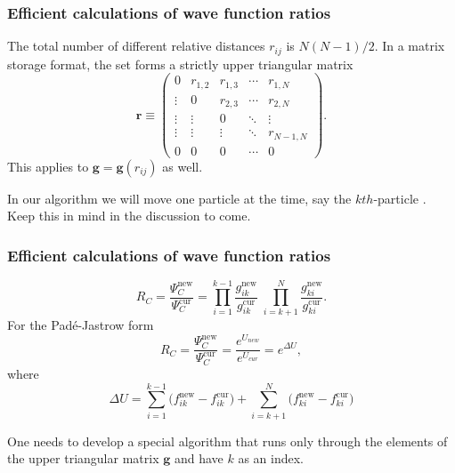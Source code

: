 \documentclass[compress]{beamer}
\newcommand{\bfv}[1]{\boldsymbol{#1}}                     %
\begin{document}
\frame
 {
   \frametitle{Efficient calculations of wave function ratios}
 \begin{small}
 {\scriptsize

The total number of different relative distances $r_{ij}$ is $N(N-1)/2$. In a matrix storage format, the set forms a strictly upper triangular matrix
\begin{equation}\label{utrij}
 \bfv{r} \equiv \begin{pmatrix}
  0 & r_{1,2} & r_{1,3} & \cdots & r_{1,N} \\
  \vdots & 0       & r_{2,3} & \cdots & r_{2,N} \\
  \vdots & \vdots  & 0  & \ddots & \vdots  \\
  \vdots & \vdots  & \vdots  & \ddots  & r_{N-1,N} \\
  0 & 0  & 0  & \cdots  & 0
 \end{pmatrix}.
\end{equation}
This applies to  $\bfv{g} = \bfv{g}(r_{ij})$ as well. 

In our algorithm we will move one particle  at the time, say the $kth$-particle . Keep this in mind in the discussion to come.
 }
 \end{small}
 }


\frame
 {
   \frametitle{Efficient calculations of wave function ratios}
 \begin{small}
 {\scriptsize
\begin{equation}\label{RjfRatio}
 \boxed{R_{C} = \frac{\Psi_{C}^\mathrm{new}}{\Psi_{C}^\mathrm{cur}} =
\prod_{i=1}^{k-1}\frac{g_{ik}^\mathrm{new}}{g_{ik}^\mathrm{cur}}\;
\prod_{i=k+1}^{N}\frac{g_{ki}^\mathrm{new}}{g_{ki}^\mathrm{cur}}}.
\end{equation}\label{padepadeRatio}
For the Pad\'e-Jastrow form
\begin{equation}
 \boxed{R_{C} = \frac{\Psi_{C}^\mathrm{new}}{\Psi_{C}^\mathrm{cur}} = \frac{e^{U_{new}}}{e^{U_{cur}}} = e^{\Delta U},}
\end{equation}
where
\begin{equation}
\Delta U =
\sum_{i=1}^{k-1}\big(f_{ik}^\mathrm{new}-f_{ik}^\mathrm{cur}\big)
+
\sum_{i=k+1}^{N}\big(f_{ki}^\mathrm{new}-f_{ki}^\mathrm{cur}\big)
\end{equation}

One needs to develop a special algorithm 
that runs only through the elements of the upper triangular
matrix $\bfv{g}$ and have $k$ as an index. 

 }
 \end{small}
 }
\end{document}
